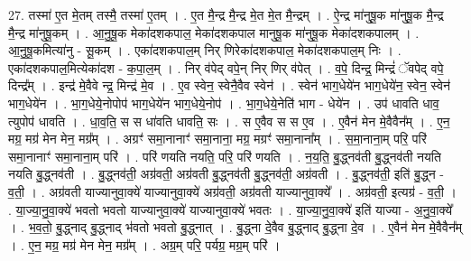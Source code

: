 \documentclass[17pt]{extarticle}
\begin{document}
27. तस्मा॑ ए॒त मे॒तम् तस्मै॒ तस्मा॑ ए॒तम् । . ए॒त मै॒न्द्र मै॒न्द्र मे॒त मे॒त मै॒न्द्रम् । . ऐ॒न्द्र मा॑नुषू॒क मा॑नुषू॒क मै॒न्द्र मै॒न्द्र मा॑नुषू॒कम् । . आ॒नु॒षू॒क मेका॑दशकपाल॒ मेका॑दशकपाल मानुषू॒क मा॑नुषू॒क मेका॑दशकपालम् । . आ॒नु॒षू॒कमित्या॑नु - सू॒कम् । . एका॑दशकपाल॒म् निर् णिरेका॑दशकपाल॒ मेका॑दशकपाल॒म् निः । . एका॑दशकपाल॒मित्येका॑दश - क॒पा॒ल॒म् । . निर् व॑पेद् वपे॒न् निर् णिर् व॑पेत् । . व॒पे॒ दिन्द्र॒ मिन्द्रं॑ ॅवपेद् वपे॒ दिन्द्र᳚म् । . इन्द्र॑ मे॒वैवे न्द्र॒ मिन्द्र॑ मे॒व । . ए॒व स्वेन॒ स्वेनै॒वैव स्वेन॑ । . स्वेन॑ भाग॒धेये॑न भाग॒धेये॑न॒ स्वेन॒ स्वेन॑ भाग॒धेये॑न । . भा॒ग॒धेये॒नोपोप॑ भाग॒धेये॑न भाग॒धेये॒नोप॑ । . भा॒ग॒धेये॒नेति॑ भाग - धेये॑न । . उप॑ धावति धाव॒ त्युपोप॑ धावति । . धा॒व॒ति॒ स स धा॑वति धावति॒ सः । . स ए॒वैव स स ए॒व । . ए॒वैन॑ मेन मे॒वैवैन᳚म् । . ए॒न॒ मग्र॒ मग्र॑ मेन मेन॒ मग्र᳚म् । . अग्रꣳ॑ समा॒नानाꣳ॑ समा॒नाना॒ मग्र॒ मग्रꣳ॑ समा॒नाना᳚म् । . स॒मा॒नाना॒म् परि॒ परि॑ समा॒नानाꣳ॑ समा॒नाना॒म् परि॑ । . परि॑ णयति नयति॒ परि॒ परि॑ णयति । . न॒य॒ति॒ बु॒द्ध्नव॑ती बु॒द्ध्नव॑ती नयति नयति बु॒द्ध्नव॑ती । . बु॒द्ध्नव॑ती॒ अग्र॑वती॒ अग्र॑वती बु॒द्ध्नव॑ती बु॒द्ध्नव॑ती॒ अग्र॑वती । . बु॒द्ध्नव॑ती॒ इति॑ बु॒द्ध्न - व॒ती॒ । . अग्र॑वती याज्यानुवा॒क्ये॑ याज्यानुवा॒क्ये॑ अग्र॑वती॒ अग्र॑वती याज्यानुवा॒क्ये᳚ । . अग्र॑वती॒ इत्यग्र॑ - व॒ती॒ । . या॒ज्या॒नु॒वा॒क्ये॑ भवतो भवतो याज्यानुवा॒क्ये॑ याज्यानुवा॒क्ये॑ भवतः । . या॒ज्या॒नु॒वा॒क्ये॑ इति॑ याज्या - अ॒नु॒वा॒क्ये᳚ । . भ॒व॒तो॒ बु॒द्ध्नाद् बु॒द्ध्नाद् भ॑वतो भवतो बु॒द्ध्नात् । . बु॒द्ध्ना दे॒वैव बु॒द्ध्नाद् बु॒द्ध्ना दे॒व । . ए॒वैन॑ मेन मे॒वैवैन᳚म् । . ए॒न॒ मग्र॒ मग्र॑ मेन मेन॒ मग्र᳚म् । . अग्र॒म् परि॒ पर्यग्र॒ मग्र॒म् परि॑ । \newline
\end{document}
